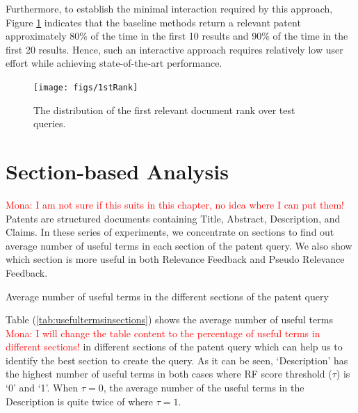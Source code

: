 Furthermore, to establish the minimal interaction required by this
approach, Figure \ref{fig:FirstTPRankHisto} indicates that the
baseline methods return a relevant patent approximately 80\% of the
time in the first 10 results and 90\% of the time in the first 20
results.  Hence, such an interactive approach requires relatively low
user effort while achieving state-of-the-art performance.

\begin{figure}
\begin{centering}
\texttt{[image: figs/1stRank]}
\par\end{centering}

\protect\caption{The distribution of the first relevant document rank over test queries.}
\label{fig:FirstTPRankHisto}
\end{figure}
\section{Section-based Analysis}
\textcolor{red}{Mona: I am not sure if this suits in this chapter, no idea where I can put them!}\\
Patents are structured documents containing Title, Abstract, Description, and Claims. In these series of experiments, we concentrate on sections to find out average number of useful terms in each section of the patent query. We also show which section is more useful in both Relevance Feedback and Pseudo Relevance Feedback.
\begin{table}[t!]
  \begin{center}
   \caption{Average number of useful terms in the different sections of the patent query}
     
  \label{tab:usefultermsinsections}
  \end{center}  
\end{table}
\FloatBarrier
Table (\ref{tab:usefultermsinsections}) shows the average number of useful terms \textcolor{red}{Mona: I will change the table content to the percentage of useful terms in different sections!} in different sections of the patent query which can help us to identify the best section to create the query.
As it can be seen, `Description' has the highest number of useful terms in both cases where RF score threshold ($ \tau $) is `0' and `1'. When $ \tau = 0 $, the average number of the useful terms in the Description is quite twice of where $ \tau = 1 $. 

